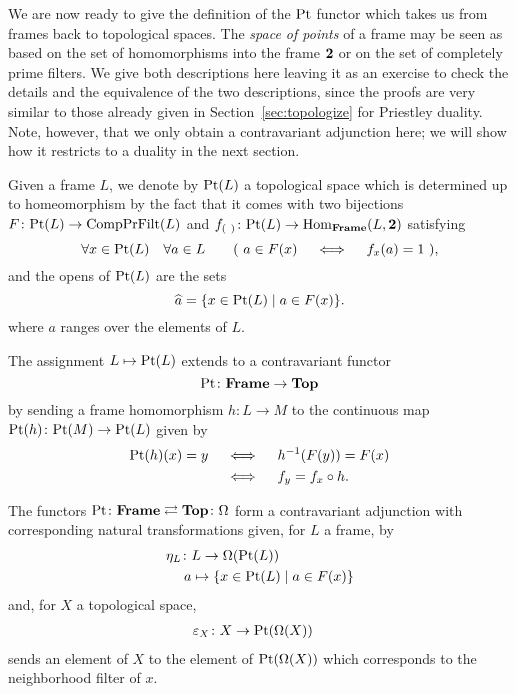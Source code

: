 We are now ready to give the definition of the $\mathrm{Pt}$ functor which takes us from frames back to topological spaces. The \emph{space of points} of a frame may be seen as based on the set of homomorphisms into the frame ${\bf 2}$ or on the set of completely prime filters. We give both descriptions here leaving it as an exercise to check the details and the equivalence of the two descriptions, since the proofs are very similar to those already given in Section~\ref{sec:topologize} for Priestley duality. Note, however, that we only obtain a contravariant adjunction here; we will show how it restricts to a duality in the next section.

\begin{definition}\label{def:Pt-functor}
Given a frame $L$, we denote by $\mathrm{Pt}(L)$ a topological space which is determined up to homeomorphism by the fact that it comes with two bijections $F\colon\mathrm{Pt}(L)\to \mathrm{CompPrFilt}(L)$ and $f_{(\ )}\colon\mathrm{Pt}(L)\to\mathrm{Hom}_{\mathbf{Frame}}(L,{\bf 2})$ satisfying
\[
\forall x\in\mathrm{Pt}(L)\quad\forall a\in L\qquad (\ a\in F(x)\quad\iff\quad f_x(a)=1\ ),
\]
and the opens of $\mathrm{Pt}(L)$ are the sets
\[
\widehat{a}=\{x\in\Pt(L)\mid a\in F(x)\}.%
\]
where $a$ ranges over the elements of $L$.

The assignment $L\mapsto\mathrm{Pt}(L)$ extends to a contravariant functor
\[
\mathrm{Pt}\colon\mathbf{Frame}\to\mathbf{Top}
\]
by sending a frame homomorphism $h\colon L\to M$ to the continuous map $\mathrm{Pt}(h)\colon\mathrm{Pt}(M)\to\mathrm{Pt}(L)$ given by
\begin{align*}
\mathrm{Pt}(h)(x)=y\quad &\iff\quad h^{-1}( F(y))= F(x)\\
                           &\iff\quad f_y=f_x\circ h.
\end{align*}
\end{definition}

\begin{theorem}\label{thrm:OmegaPoint-adjunction}
The functors $\mathrm{Pt}\colon\mathbf{Frame}\rightleftarrows\mathbf{Top}\colon\Omega$ form a contravariant adjunction with corresponding natural transformations given, for $L$ a frame, by
\begin{align*}
\eta_L\colon & L\to \Omega(\mathrm{Pt}(L))\\
         a          &\mapsto \{x\in\mathrm{Pt}(L)\mid a\in  F(x)\}
\end{align*}
and, for $X$ a topological space,
\begin{align*}
\varepsilon_X\colon & X\to \Pt(\Omega(X))%
\end{align*}
sends an element of $X$ to the element of $\mathrm{Pt}(\Omega(X))$ which corresponds to the neighborhood filter of $x$.
\end{theorem}

